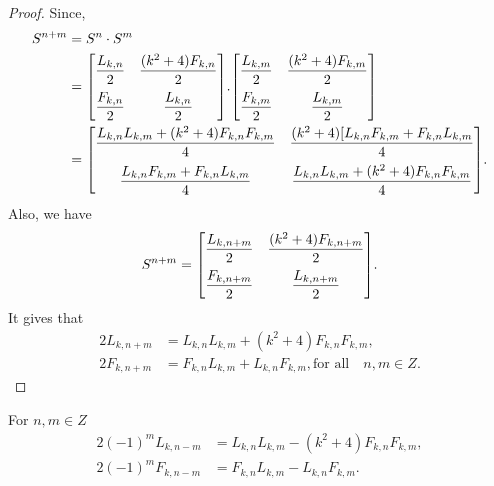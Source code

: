 \begin{proof}
Since, \begin{align*}
S^{n+m}&=S^n\cdot S^m\\
									 &={
 \begin{bmatrix}{}
    \dfrac{L_{k,n}}{2} & \dfrac{(k^2+4)F_{k,n}}{2}\vspace{.2cm} \\
    \dfrac{F_{k,n}}{2} & \dfrac{L_{k,n}}{2} \\
	\end{bmatrix}
	}.{
 \begin{bmatrix}{}
    \dfrac{L_{k,m}}{2} & \dfrac{(k^2+4)F_{k,m}}{2}\vspace{.2cm} \\
    \dfrac{F_{k,m}}{2} & \dfrac{L_{k,m}}{2} \\
	\end{bmatrix}
	}\\
									 &={
 \begin{bmatrix}{}
    \dfrac{L_{k,n}L_{k,m}+(k^2+4)F_{k,n}F_{k,m}}{4} & \dfrac{(k^2+4)[L_{k,n}F_{k,m}+F_{k,n}L_{k,m}}{4}\vspace{.2cm} \\
    \dfrac{L_{k,n}F_{k,m}+F_{k,n}L_{k,m}}{4} & \dfrac{L_{k,n}L_{k,m}+(k^2+4)F_{k,n}F_{k,m}}{4} \\
	\end{bmatrix}
	}.
\end{align*}		
Also, we have
$$S^{n+m}={
 \begin{bmatrix}{}
    \dfrac{L_{k,n+m}}{2} & \dfrac{(k^2+4)F_{k,n+m}}{2} \vspace{.2cm}\\
    \dfrac{F_{k,n+m}}{2} & \dfrac{L_{k,n+m}}{2} \\
	\end{bmatrix}
	}.$$
	It gives that
\begin{align*}
2L_{k,n+m}&=L_{k,n}L_{k,m}+(k^2+4)F_{k,n}F_{k,m},\\ 
2F_{k,n+m}&=F_{k,n}L_{k,m}+L_{k,n}F_{k,m}, \text{for all}\quad n,m\in Z.
\end{align*}
\end{proof}
\begin{lemma}For $n,m\in Z$\label{3-l-3}
\begin{align}
2(-1)^mL_{k,n-m}&=L_{k,n}L_{k,m}-(k^2+4)F_{k,n}F_{k,m},\\
2(-1)^mF_{k,n-m}&=F_{k,n}L_{k,m}-L_{k,n}F_{k,m}.
\end{align}
\end{lemma}
